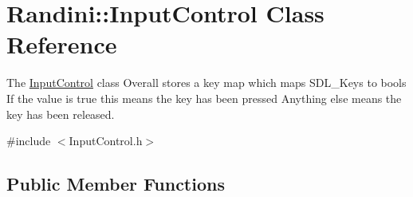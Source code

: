 \hypertarget{classRandini_1_1InputControl}{
\section{Randini::InputControl Class Reference}
\label{classRandini_1_1InputControl}
}


The \hyperlink{classRandini_1_1InputControl}{InputControl} class Overall stores a key map which maps SDL\_\-Keys to bools If the value is true this means the key has been pressed Anything else means the key has been released.  


{\ttfamily \#include $<$InputControl.h$>$}\subsection*{Public Member Functions}

